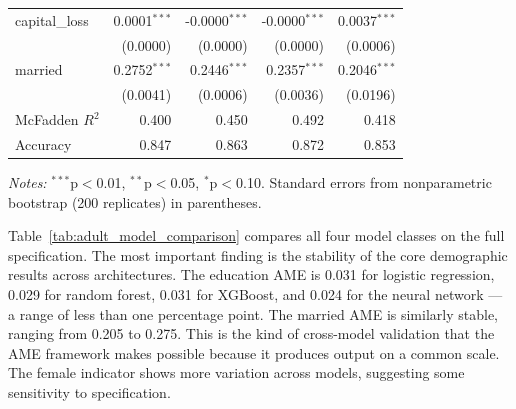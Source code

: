 \documentclass[conference]{IEEEtran}
\begin{document}
\begin{table}[htbp]
\begin{threeparttable}
\begin{tabular}{lrrrr}
				capital\_loss & 0.0001$^{***}$ & -0.0000$^{***}$ & -0.0000$^{***}$ & 0.0037$^{***}$ \\
				& (0.0000) & (0.0000) & (0.0000) & (0.0006) \\
				married & 0.2752$^{***}$ & 0.2446$^{***}$ & 0.2357$^{***}$ & 0.2046$^{***}$ \\
				& (0.0041) & (0.0006) & (0.0036) & (0.0196) \\
				\midrule
				McFadden $R^2$ & 0.400 & 0.450 & 0.492 & 0.418 \\
				Accuracy & 0.847 & 0.863 & 0.872 & 0.853 \\
				\bottomrule
			\end{tabular}
			\begin{tablenotes}
				\footnotesize
				\item \textit{Notes:} $^{***}$p$<$0.01, $^{**}$p$<$0.05, $^{*}$p$<$0.10. Standard errors from nonparametric bootstrap (200 replicates) in parentheses.
			\end{tablenotes}
		\end{threeparttable}
	\end{table}
	
	Table~\ref{tab:adult_model_comparison} compares all four model classes on the full specification. The most important finding is the stability of the core demographic results across architectures. The education AME is 0.031 for logistic regression, 0.029 for random forest, 0.031 for XGBoost, and 0.024 for the neural network --- a range of less than one percentage point. The married AME is similarly stable, ranging from 0.205 to 0.275. This is the kind of cross-model validation that the AME framework makes possible because it produces output on a common scale. The female indicator shows more variation across models, suggesting some sensitivity to specification.
	
\end{document}
